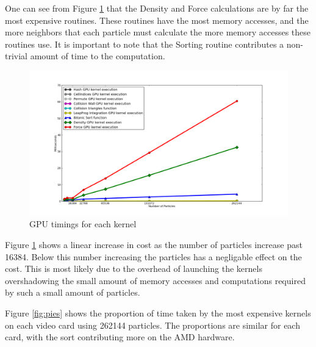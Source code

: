 \pagebreak
One can see from Figure \ref{fig:kernel_time} that the Density and Force calculations are by far
the most expensive routines. These routines have the most memory accesses, and
the more neighbors that each particle must calculate the more memory accesses
these routines use. It is important to note that the Sorting routine
contributes a non-trivial amount of time to the computation.


\begin{figure}[!htc]
 		\centering
		\includegraphics[scale=0.4]{figures/nv_kernel_num.png}
        \caption{ GPU timings for each kernel }
        \label{fig:kernel_time}
\end{figure}

Figure \ref{fig:kernel_time} shows a linear increase in cost as the number of
particles increase past 16384. Below this number increasing the particles has a
negligable effect on the cost. This is most likely due to the overhead of
launching the kernels overshadowing the small amount of memory accesses and
computations required by such a small amount of particles. 

\pagebreak

Figure \ref{fig:pies} shows the proportion of time taken by the most expensive
kernels on each video card using 262144 particles. The proportions are similar
for each card, with the sort contributing more on the AMD hardware.

